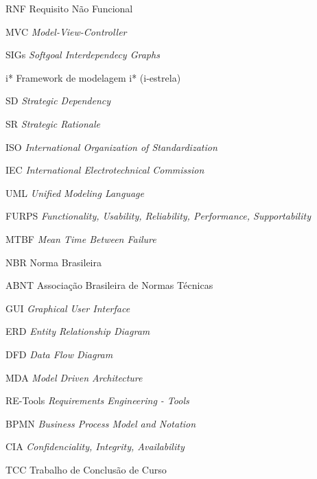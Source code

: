 \begin{siglas}
  \item[RNF] Requisito Não Funcional
  \item[MVC] \textit{Model-View-Controller}
  \item[SIGs] \textit{Softgoal Interdependecy Graphs}
  \item[i*] Framework de modelagem i* (i-estrela)
  \item[SD] \textit{Strategic Dependency}
  \item[SR] \textit{Strategic Rationale}
  \item[ISO] \textit{International Organization of Standardization}
  \item[IEC] \textit{International Electrotechnical Commission}
  \item[UML] \textit{Unified Modeling Language}
  \item[FURPS] \textit{Functionality, Usability, Reliability, Performance, Supportability}
  \item[MTBF] \textit{Mean Time Between Failure}
  \item[NBR] Norma Brasileira
  \item[ABNT] Associação Brasileira de Normas Técnicas
  \item[GUI] \textit{Graphical User Interface}
  \item[ERD] \textit{Entity Relationship Diagram}
  \item[DFD] \textit{Data Flow Diagram}
  \item[MDA] \textit{Model Driven Architecture}
  \item[RE-Tools] \textit{Requirements Engineering - Tools}
  \item[BPMN] \textit{Business Process Model and Notation}
  \item[CIA] \textit{Confidenciality, Integrity, Availability}
  \item[TCC] Trabalho de Conclusão de Curso
\end{siglas}
